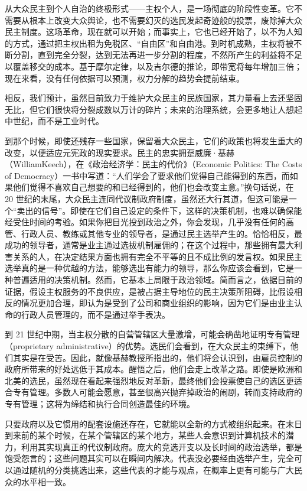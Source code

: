 从大众民主到个人自治的终极形式——主权个人，是一场彻底的阶段性变革。它不需要从根本上改变大众舆论，也不需要幻灭的选民发起奇迹般的投票，废除掉大众民主制度。这场革命，现在就可以开始；而事实上，它也已经开始了，以不为人知的方式，通过把主权出租为免税区、“自由区”和自由港。到时机成熟，主权将被不断分割，直到完全分裂，达到无法再进一步分割的程度，不然所产生的利益将不足以覆盖移交的成本。基于摩尔定律，以及吉尔德的推论，即带宽将每年增加三倍；现在来看，没有任何依据可以预测，权力分解的趋势会提前结束。

相反，我们预计，虽然目前致力于维护大众民主的民族国家，其力量看上去还坚固无比，但它们很快将分裂成数以万计的碎片；未来的治理系统，会更多地让人想起中世纪，而不是工业时代。

到那个时候，即使还残存一些国家，保留着大众民主，它们的政策也将发生重大的改变，以便适应元宪政的现实要求。民主的忠实拥趸威廉·基赫（WilliamKeech），在《政治经济学：民主的代价》（Economic Politics: The Costs of Democracy）一书中写道：“人们学会了要求他们觉得自己能得到的东西，而如果他们觉得不喜欢自己想要的和已经得到的，他们也会改变主意。”换句话说，在 20 世纪的末尾，大众民主连同代议制政府制度，虽然还大行其道，但这可能是一个“卖出的信号”。即使在它们自己设定的条件下，这样的决策机制，也难以确保能经受住时间的考验。如果你把目光投到政治之外，你会发现，几乎没有任何的高管、行政人员、教练或其他专业的领导者，是通过民主选举产生的。恰恰相反，最成功的领导者，通常是业主通过选拔机制雇佣的；在这个过程中，那些拥有最大利害关系的人，在决定结果方面也拥有完全不平等的且不成比例的发言权。如果民主选举真的是一种优越的方法，能够选出有能力的领导，那么你应该会看到，它是一种普遍适用的决策机制。然而，它基本上局限于政治领域。简而言之，依据目前的证据，假设主权服务的不良供应，是被占据主导地位的民主决策所阻碍，比假设相反的情况更加合理，即认为是受到了公司和商业组织的影响，因为它们是由业主认命的行政人员管理的，而不是通过举手表决。

到 21 世纪中期，当主权分散的自营管辖区大量激增，可能会确凿地证明专有管理（proprietary administrative）的优势。选民们会看到，在大众民主的束缚下，他们其实是在受苦。因此，就像基赫教授所指出的，他们将会认识到，由雇员控制的政府所带来的好处远低于其成本。醒悟之后，他们会走上改革之路。即使是欧洲和北美的选民，虽然现在看起来强烈地反对革新，最终他们会投票使自己的选区更适合专有管理。多数人可能会愿意，甚至很高兴抛弃掉政治的闹剧，转而支持政府的专有管理；这将为缔结和执行合同创造最佳的环境。

只要政府以及它惯用的配套设施还存在，它就能以全新的方式被组织起来。在末日到来前的某个时候，在某个管辖区的某个地方，某些人会意识到计算机技术的潜力，利用其实现真正的代议制政府。庞大的竞选开支以及长时间的政治选举，都是饱受怨言的；这些问题其实可以在瞬间内解决。代表没必要经由选举产生，完全可以通过随机的分类挑选出来，这些代表的才能与观点，在概率上更有可能与广大民众的水平相一致。

